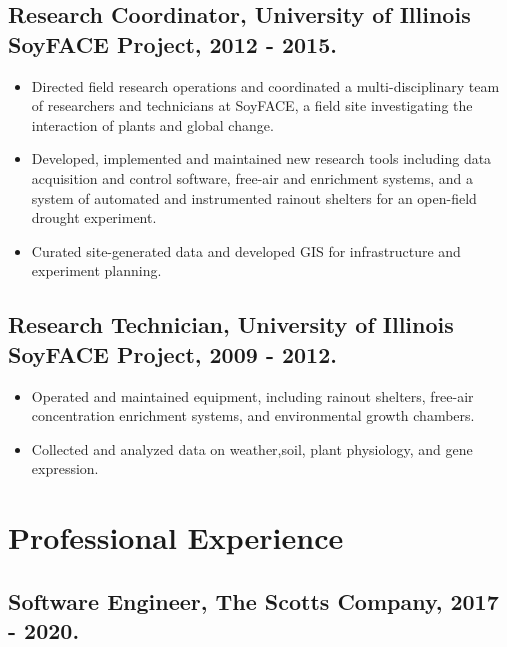 \documentclass[letterpaper]{article}
\begin{document}
  \subsection*{Research Coordinator, University of Illinois SoyFACE Project, 2012 - 2015.}

    \begin{itemize}

      \item Directed field research operations and coordinated a multi-disciplinary team of researchers and technicians at SoyFACE, a field site investigating the interaction of plants and global change.
      \item Developed, implemented and maintained new research tools including data acquisition and control software, free-air  and  enrichment systems, and a system of automated and instrumented rainout shelters for an open-field drought experiment.
      \item Curated site-generated data and developed GIS for infrastructure and experiment planning.

    \end{itemize}

  \subsection*{Research Technician, University of Illinois SoyFACE Project, 2009 - 2012.}

    \begin{itemize}

      \item Operated and maintained equipment, including rainout shelters, free-air concentration enrichment systems, and environmental growth chambers.
      \item Collected and analyzed data on weather,soil, plant physiology, and gene expression.

    \end{itemize}
    
\section*{Professional Experience}

  \subsection*{Software Engineer, The Scotts Company, 2017 - 2020.}
\end{document}
